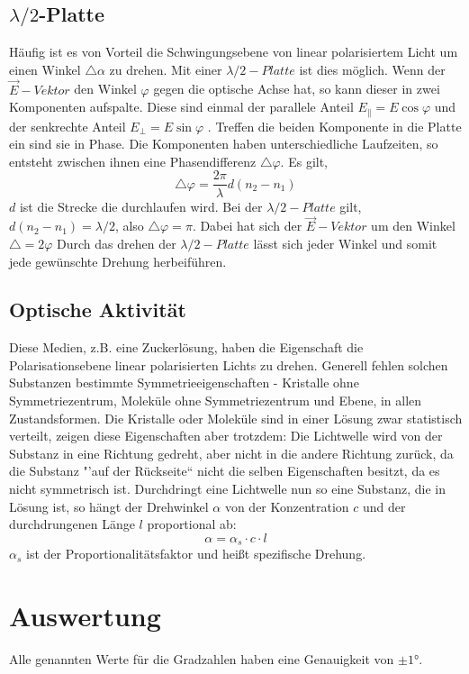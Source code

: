 \subsection{$ \lambda/2 $-Platte}
Häufig ist es von Vorteil die Schwingungsebene von linear polarisiertem Licht um einen Winkel $ \bigtriangleup\alpha $ zu drehen. Mit einer $ \lambda/2-Platte $ ist dies möglich. Wenn der $ \vec{E}-Vektor $ den Winkel $ \varphi $ gegen die optische Achse hat, so kann dieser in zwei Komponenten aufspalte. Diese sind einmal der parallele Anteil $ E_{\|} = E\cos \varphi $ und der senkrechte Anteil $ E_{\bot}=E\sin \varphi $ . Treffen die beiden Komponente in die Platte ein sind sie in Phase. Die Komponenten haben unterschiedliche Laufzeiten, so entsteht zwischen ihnen eine Phasendifferenz $\bigtriangleup\varphi $. Es gilt, 
\begin{equation}
\bigtriangleup\varphi=\frac{2\pi}{\lambda}d(n_{2}-n_{1})
\end{equation}
$d$ ist die Strecke die durchlaufen wird. Bei der $ \lambda/2 - Platte $ gilt, $ d(n_{2}-n_{1})=\lambda/2 $, also $ \bigtriangleup\varphi=\pi $. Dabei hat sich der $ \vec{E}-Vektor $ um den Winkel $\bigtriangleup=2\varphi $ Durch das drehen der $ \lambda/2-Platte $ lässt sich jeder Winkel und somit jede gewünschte Drehung herbeiführen.
\subsection{Optische Aktivität}
Diese Medien, z.B. eine Zuckerlösung, haben die Eigenschaft die Polarisationsebene linear polarisierten Lichts zu drehen. Generell fehlen solchen Substanzen bestimmte Symmetrieeigenschaften - Kristalle ohne Symmetriezentrum, Moleküle ohne Symmetriezentrum und Ebene, in allen Zustandsformen. Die Kristalle oder Moleküle sind in einer Lösung zwar statistisch verteilt, zeigen diese Eigenschaften aber trotzdem: Die Lichtwelle wird von der Substanz in eine Richtung gedreht, aber nicht in die andere Richtung zurück, da die Substanz "'auf der Rückseite`` nicht die selben Eigenschaften besitzt, da es nicht symmetrisch ist. Durchdringt eine Lichtwelle nun so eine Substanz, die in Lösung ist, so hängt der Drehwinkel $\alpha$ von der Konzentration $c$ und der durchdrungenen Länge $l$ proportional ab:
\begin{equation}
\alpha = \alpha_{s}\cdot c\cdot l
\end{equation}
$\alpha_{s}$ ist der Proportionalitätsfaktor und heißt spezifische Drehung.
\section{Auswertung}
Alle genannten Werte für die Gradzahlen haben eine Genauigkeit von $ \pm 1° $.
